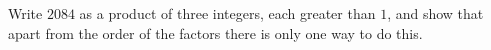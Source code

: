 Write $2084$ as a product of three integers, each greater than $1$, and show that apart from the order of the factors there is only one way to do this.
